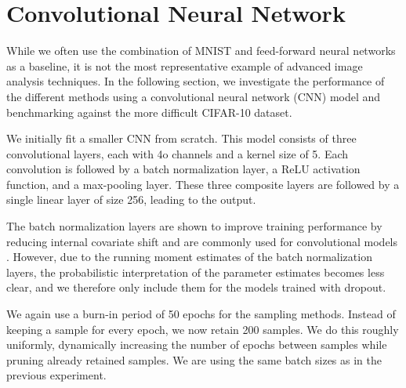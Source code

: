 \FloatBarrier
\section{Convolutional Neural Network}

While we often use the combination of MNIST and feed-forward neural networks as a baseline, it is not the most representative example of advanced image analysis techniques.
In the following section, we investigate the performance of the different methods using a convolutional neural network (CNN) model and benchmarking against the more difficult CIFAR-10 dataset.

We initially fit a smaller CNN from scratch.
This model consists of three convolutional layers, each with 4o channels and a kernel size of 5.
Each convolution is followed by a batch normalization layer, a ReLU activation function, and a max-pooling layer.
These three composite layers are followed by a single linear layer of size 256, leading to the output.

The batch normalization layers are shown to improve training performance by reducing internal covariate shift and are commonly used for convolutional models \autocite{ioffe_batch_2015}. 
However, due to the running moment estimates of the batch normalization layers, the probabilistic interpretation of the parameter estimates becomes less clear, and we therefore only include them for the models trained with dropout. 

We again use a burn-in period of 50 epochs for the sampling methods.
Instead of keeping a sample for every epoch, we now retain 200 samples.
We do this roughly uniformly, dynamically increasing the number of epochs between samples while pruning already retained samples.
We are using the same batch sizes as in the previous experiment.

